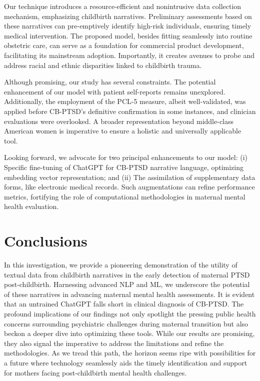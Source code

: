 \documentclass[bst/sn-nature]{sn-jnl}%
\theoremstyle{thmstyleone}%
\theoremstyle{thmstyletwo}%
\theoremstyle{thmstylethree}%
\begin{document}
Our technique introduces a resource-efficient and nonintrusive data collection mechanism, emphasizing childbirth narratives. Preliminary assessments based on these narratives can pre-emptively identify high-risk individuals, ensuring timely medical intervention.
The proposed model, besides fitting seamlessly into routine obstetric care, can serve as a foundation for commercial product development, facilitating its mainstream adoption. 
Importantly, it creates avenues to probe and address racial and ethnic disparities linked to childbirth trauma.

Although promising, our study has several constraints. 
The potential enhancement of our model with patient self-reports remains unexplored. 
Additionally, the employment of the PCL-5 measure, albeit well-validated, was applied before CB-PTSD's definitive confirmation in some instances, and clinician evaluations were overlooked. 
A broader representation beyond middle-class American women is imperative to ensure a holistic and universally applicable tool.

Looking forward, we advocate for two principal enhancements to our model:
(i) Specific fine-tuning of ChatGPT for CB-PTSD narrative language, optimizing embedding vector representation; and 
(ii) The assimilation of supplementary data forms, like electronic medical records.
Such augmentations can refine performance metrics, fortifying the role of computational methodologies in maternal mental health evaluation.


\section{Conclusions}
\label{sec:conclusions}
In this investigation, we provide a pioneering demonstration of the utility of textual data from childbirth narratives in the early detection of maternal PTSD post-childbirth. 
Harnessing advanced NLP and ML, we underscore the potential of these narratives in advancing maternal mental health assessments.
It is evident that an untrained ChatGPT falls short in clinical diagnosis of CB-PTSD.
The profound implications of our findings not only spotlight the pressing public health concerns surrounding psychiatric challenges during maternal transition but also beckon a deeper dive into optimizing these tools.
While our results are promising, they also signal the imperative to address the limitations and refine the methodologies. 
As we tread this path, the horizon seems ripe with possibilities for a future where technology seamlessly aids the timely identification and support for mothers facing post-childbirth mental health challenges.
\end{document}
